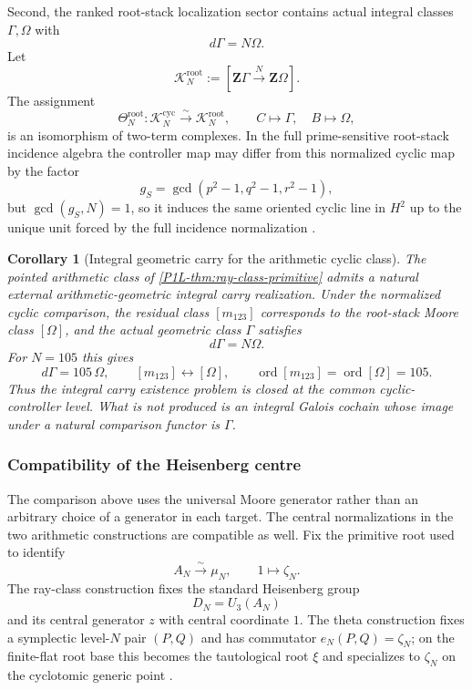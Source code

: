\documentclass[11pt]{article}
\newtheorem{corollary}[theorem]{Corollary}
\theoremstyle{remark}
\newcommand{\Z}{\mathbf Z}
\begin{document}
Second, the ranked root-stack localization sector contains actual integral classes $\Gamma,\Omega$ with
\begin{equation}\label{P1L-eq:root-carry-v04}
 \boxed{d\Gamma=N\Omega.}
\end{equation}
Let
\[
 \mathcal K_N^{\mathrm{root}}
 :=[\Z\Gamma\xrightarrow{\,N\,}\Z\Omega].
\]
The assignment
\begin{equation}\label{P1L-eq:root-moore-iso}
 \Theta_N^{\mathrm{root}}:
 \mathcal K_N^{\mathrm{cyc}}\xrightarrow{\sim}
 \mathcal K_N^{\mathrm{root}},
 \qquad C\mapsto\Gamma,\quad B\mapsto\Omega,
\end{equation}
is an isomorphism of two-term complexes.  In the full prime-sensitive root-stack incidence algebra the controller map may differ from this normalized cyclic map by the factor
\[
 g_S=\gcd(p^2-1,q^2-1,r^2-1),
\]
but $\gcd(g_S,N)=1$, so it induces the same oriented cyclic line in $H^2$ up to the unique unit forced by the full incidence normalization .

\begin{corollary}[Integral geometric carry for the arithmetic cyclic class]\label{P1L-cor:external-carry-closed}
The pointed arithmetic class of \cref{P1L-thm:ray-class-primitive} admits a natural \emph{external arithmetic-geometric} integral carry realization.  Under the normalized cyclic comparison, the residual class $[m_{123}]$ corresponds to the root-stack Moore class $[\Omega]$, and the actual geometric class $\Gamma$ satisfies
\[
 \boxed{d\Gamma=N\Omega.}
\]
For $N=105$ this gives
\[
 d\Gamma=105\,\Omega,
 \qquad
 [m_{123}]\longleftrightarrow[\Omega],
 \qquad
 \operatorname{ord}[m_{123}]=\operatorname{ord}[\Omega]=105.
\]
Thus the integral carry existence problem is closed at the common cyclic-controller level.  What is not produced is an integral Galois cochain whose image under a natural comparison functor is $\Gamma$.
\end{corollary}

\subsubsection{Compatibility of the Heisenberg centre}

The comparison above uses the universal Moore generator rather than an arbitrary choice of a generator in each target.  The central normalizations in the two arithmetic constructions are compatible as well.  Fix the primitive root used to identify
\[
 A_N\xrightarrow{\sim}\mu_N,
 \qquad 1\longmapsto\zeta_N.
\]
The ray-class construction fixes the standard Heisenberg group
\[
 D_N=U_3(A_N)
\]
and its central generator $z$ with central coordinate $1$.  The theta construction fixes a symplectic level-$N$ pair $(P,Q)$ and has commutator $e_N(P,Q)=\zeta_N$; on the finite-flat root base this becomes the tautological root $\xi$ and specializes to $\zeta_N$ on the cyclotomic generic point .
\end{document}
